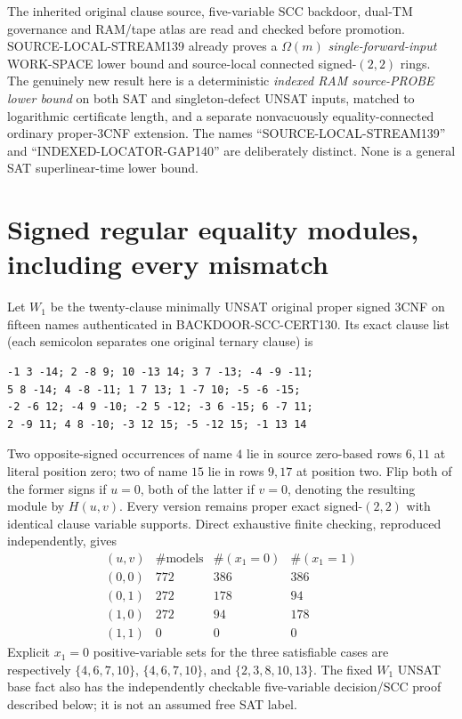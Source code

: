 \documentclass[11pt]{article}
\begin{document}
The inherited original clause source, five-variable SCC backdoor, dual-TM governance and RAM/tape atlas are read and checked before promotion. SOURCE-LOCAL-STREAM139 already proves a $\Omega(m)$ \emph{single-forward-input} WORK-SPACE lower bound and source-local connected signed-$(2,2)$ rings. The genuinely new result here is a deterministic \emph{indexed RAM source-PROBE lower bound} on both SAT and singleton-defect UNSAT inputs, matched to logarithmic certificate length, and a separate nonvacuously equality-connected ordinary proper-3CNF extension. The names ``SOURCE-LOCAL-STREAM139'' and ``INDEXED-LOCATOR-GAP140'' are deliberately distinct. None is a general SAT superlinear-time lower bound.

\section{Signed regular equality modules, including every mismatch}
Let $W_1$ be the twenty-clause minimally UNSAT original proper signed 3CNF on fifteen names authenticated in BACKDOOR-SCC-CERT130. Its exact clause list (each semicolon separates one original ternary clause) is
\begin{verbatim}
-1 3 -14; 2 -8 9; 10 -13 14; 3 7 -13; -4 -9 -11;
5 8 -14; 4 -8 -11; 1 7 13; 1 -7 10; -5 -6 -15;
-2 -6 12; -4 9 -10; -2 5 -12; -3 6 -15; 6 -7 11;
2 -9 11; 4 8 -10; -3 12 15; -5 -12 15; -1 13 14
\end{verbatim}
Two opposite-signed occurrences of name $4$ lie in source zero-based rows $6,11$ at literal position zero; two of name $15$ lie in rows $9,17$ at position two. Flip both of the former signs if $u=0$, both of the latter if $v=0$, denoting the resulting module by $H(u,v)$. Every version remains proper exact signed-$(2,2)$ with identical clause variable supports. Direct exhaustive finite checking, reproduced independently, gives
\[
\begin{array}{c|rrr}
(u,v)&\#\mathrm{models}&\#(x_1=0)&\#(x_1=1)\\\hline
(0,0)&772&386&386\\
(0,1)&272&178&94\\
(1,0)&272&94&178\\
(1,1)&0&0&0
\end{array} \tag{1}
\]
Explicit $x_1=0$ positive-variable sets for the three satisfiable cases are respectively $\{4,6,7,10\}$, $\{4,6,7,10\}$, and $\{2,3,8,10,13\}$. The fixed $W_1$ UNSAT base fact also has the independently checkable five-variable decision/SCC proof described below; it is not an assumed free SAT label.
\end{document}
